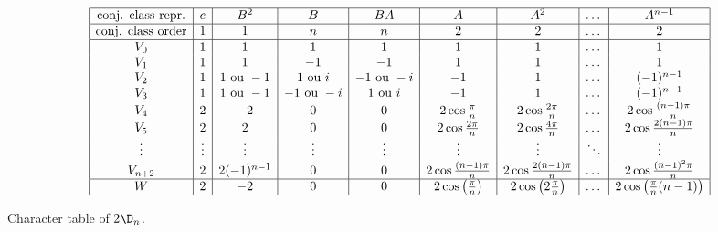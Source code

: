 \documentclass{worksheetclass}
\begin{document}
            \begin{table}[H]
                \centering
                {\small
                \begin{equation*}
                        \begin{array}{|c|c|c|c|c|c|c|c|c|}
                            \hline
                            \text{conj. class repr.} & e & B^2 & B & BA & A & A^2 & \dots & A^{n-1} \\ \hline
                            \text{conj. class order} & 1 & 1 & n & n & 2 & 2 & \dots & 2 \\
                            \hline
                            V_0 & 1 & 1 & 1 & 1 & 1 & 1 & \dots & 1 \\ 
                            V_1 & 1 & 1 & -1 & -1 & 1 & 1 & \dots & 1 \\ 
                            V_2 & 1 & 1 \text{ ou } -1 & 1 \text{ ou } i & -1 \text{ ou } -i & -1 & 1 & \dots & (-1)^{n-1} \\ 
                            V_3 & 1 & 1 \text{ ou } -1 & -1 \text{ ou } -i & 1 \text{ ou } i & -1 & 1 & \dots & (-1)^{n-1} \\
                            V_4 & 2 & -2 & 0 & 0 & 2\cos\frac{\pi}{n} & 2\cos\frac{2\pi}{n} & \dots & 2\cos\frac{(n-1)\pi}{n}\\
                            V_5 & 2 & 2 & 0 & 0 & 2\cos\frac{2\pi}{n} & 2\cos\frac{4\pi}{n} & \dots & 2\cos\frac{2(n-1)\pi}{n}\\
                            \vdots & \vdots & \vdots & \vdots & \vdots & \vdots & \vdots & \ddots & \vdots \\
                            V_{n+2} & 2 & 2(-1)^{n-1} & 0 & 0 & 2\cos\frac{(n-1)\pi}{n} & 2\cos\frac{2(n-1)\pi}{n} & \dots & 2\cos\frac{(n-1)^2\pi}{n} \\ \hline
                            W & 2 & -2 & 0 & 0 & 2\cos\left(\frac{\pi}{n}\right) & 2\cos\left(2\frac{\pi}{n}\right) & \dots & 2\cos\left(\frac{\pi}{n}(n-1)\right) \\ \hline
                            \end{array}
                    \end{equation*}}
                \caption{Character table of $2\D_n$.}
            \end{table}
\end{document}
